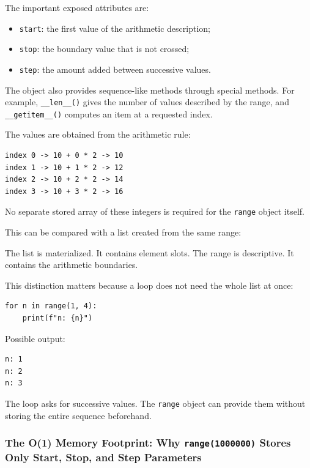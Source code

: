The important exposed attributes are:

\begin{itemize}
    \item \texttt{start}: the first value of the arithmetic description;
    \item \texttt{stop}: the boundary value that is not crossed;
    \item \texttt{step}: the amount added between successive values.
\end{itemize}

The object also provides sequence-like methods through special methods. For example, \texttt{\_\_len\_\_()} gives the number of values described by the range, and \texttt{\_\_getitem\_\_()} computes an item at a requested index.

The values are obtained from the arithmetic rule:

\begin{verbatim}
index 0 -> 10 + 0 * 2 -> 10
index 1 -> 10 + 1 * 2 -> 12
index 2 -> 10 + 2 * 2 -> 14
index 3 -> 10 + 3 * 2 -> 16
\end{verbatim}

No separate stored array of these integers is required for the \texttt{range} object itself.

This can be compared with a list created from the same range:

The list is materialized. It contains element slots. The range is descriptive. It contains the arithmetic boundaries.

This distinction matters because a loop does not need the whole list at once:

\begin{verbatim}
for n in range(1, 4):
    print(f"n: {n}")
\end{verbatim}

Possible output:

\begin{verbatim}
n: 1
n: 2
n: 3
\end{verbatim}

The loop asks for successive values. The \texttt{range} object can provide them without storing the entire sequence beforehand.

\subsubsection{The O(1) Memory Footprint: Why \texttt{range(1000000)} Stores Only Start, Stop, and Step Parameters}

